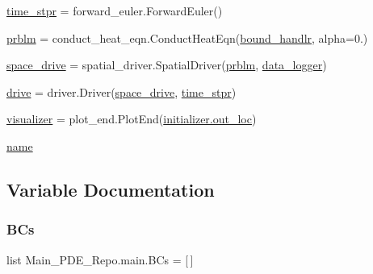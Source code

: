 \begin{DoxyCompactItemize}
\hyperlink{namespaceMain__PDE__Repo_1_1main_a87fde87043b4ff2798a7802cb61a3cbc}{time\+\_\+stpr} = forward\+\_\+euler.\+Forward\+Euler()
\item 
\hyperlink{namespaceMain__PDE__Repo_1_1main_a3868ee6e3a7637e20745a4aecbdd4002}{prblm} = conduct\+\_\+heat\+\_\+eqn.\+Conduct\+Heat\+Eqn(\hyperlink{namespaceMain__PDE__Repo_1_1main_a47a9833e51d57f5f1cbaf2e6b38274be}{bound\+\_\+handlr}, alpha=0.)
\item 
\hyperlink{namespaceMain__PDE__Repo_1_1main_a9450a1548e6c8d9316ce9ef5b053883e}{space\+\_\+drive} = spatial\+\_\+driver.\+Spatial\+Driver(\hyperlink{namespaceMain__PDE__Repo_1_1main_a3868ee6e3a7637e20745a4aecbdd4002}{prblm}, \hyperlink{namespaceMain__PDE__Repo_1_1main_af6467b085d01bd160fc83b50e93c0e54}{data\+\_\+logger})
\item 
\hyperlink{namespaceMain__PDE__Repo_1_1main_a9ef42bd76559c7db058c155f447f124b}{drive} = driver.\+Driver(\hyperlink{namespaceMain__PDE__Repo_1_1main_a9450a1548e6c8d9316ce9ef5b053883e}{space\+\_\+drive}, \hyperlink{namespaceMain__PDE__Repo_1_1main_a87fde87043b4ff2798a7802cb61a3cbc}{time\+\_\+stpr})
\item 
\hyperlink{namespaceMain__PDE__Repo_1_1main_a58d58c03728c5267032735d487a00122}{visualizer} = plot\+\_\+end.\+Plot\+End(\hyperlink{namespaceMain__PDE__Repo_1_1initializer_acf6a435968a90051222f233d914c5397}{initializer.\+out\+\_\+loc})
\item 
\hyperlink{namespaceMain__PDE__Repo_1_1main_a73c9ad9e7102300a434152e2fdff577f}{name}
\end{DoxyCompactItemize}


\subsection{Variable Documentation}
\mbox{\label{namespaceMain__PDE__Repo_1_1main_a19c90e7effeaf1735a2fb466eedd5a1c}} 
\subsubsection{\texorpdfstring{B\+Cs}{BCs}}
{\footnotesize\ttfamily list Main\+\_\+\+P\+D\+E\+\_\+\+Repo.\+main.\+B\+Cs = \mbox{[}$\,$\mbox{]}}

\mbox{\label{namespaceMain__PDE__Repo_1_1main_a47a9833e51d57f5f1cbaf2e6b38274be}} 
